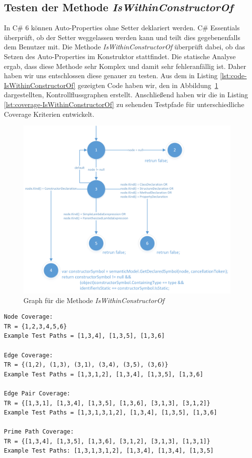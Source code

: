 \subsection{Testen der Methode \textit{IsWithinConstructorOf}}
In C\# 6 können Auto-Properties ohne Setter deklariert werden.\cite{csharp6} C\# Essentials überprüft, ob der Setter weggelassen werden kann und teilt dies gegebenenfalls dem Benutzer mit. Die Methode \textit{IsWithinConstructorOf} überprüft dabei, ob das Setzen des Auto-Properties im Konstruktor stattfindet. Die statische Analyse ergab, dass diese Methode sehr Komplex und damit sehr fehleranfällig ist. Daher haben wir uns entschlossen diese genauer zu testen. Aus dem in Listing \ref{lst:code-IsWithinConstructorOf} gezeigten Code haben wir, den in Abbildung~\ref{fig:graph-constructor} dargestellten, Kontrollflussgraphen erstellt. Anschließend haben wir die in Listing \ref{lst:coverage-IsWithinConstructorOf} zu sehenden Testpfade für unterschiedliche Coverage Kriterien entwickelt.\\
\begin{figure}[h]
	\centering
	\includegraphics[width=\textwidth]{images/GraphIsWithinConstructorOf.png}
	\caption{Graph für die Methode \textit{IsWithinConstructorOf}}
	\label{fig:graph-constructor}
\end{figure}
\begin{lstlisting}[caption={Coverage für die Mehtode \textit{IsWithinConstructorOf}},
label=lst:coverage-IsWithinConstructorOf]
Node Coverage:
TR = {1,2,3,4,5,6}
Example Test Paths = [1,3,4], [1,3,5], [1,3,6]

Edge Coverage:
TR = {(1,2), (1,3), (3,1), (3,4), (3,5), (3,6)}
Example Test Paths = [1,3,1,2], [1,3,4], [1,3,5], [1,3,6]

Edge Pair Coverage:
TR = {[1,3,1], [1,3,4], [1,3,5], [1,3,6], [3,1,3], [3,1,2]}
Example Test Paths = [1,3,1,3,1,2], [1,3,4], [1,3,5], [1,3,6]

Prime Path Coverage:
TR = {[1,3,4], [1,3,5], [1,3,6], [3,1,2], [3,1,3], [1,3,1]}
Example Test Paths: [1,3,1,3,1,2], [1,3,4], [1,3,4], [1,3,5]
\end{lstlisting}
